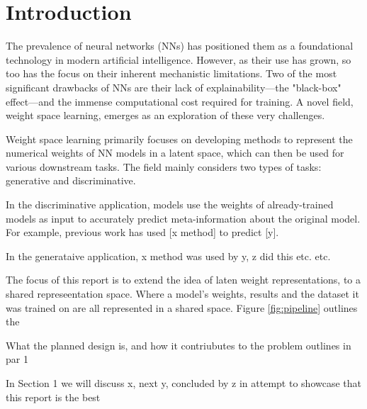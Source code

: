 \graphicspath{{introduction/fig/}}

\chapter{Introduction}
\label{chap:introduction}
The prevalence of neural networks (NNs) has positioned them as a foundational technology in modern artificial intelligence. However, as their use has grown, so too has the focus on their inherent mechanistic limitations. Two of the most significant drawbacks of NNs are their lack of explainability---the "black-box" effect---and the immense computational cost required for training. A novel field, weight space learning, emerges as an exploration of these very challenges.


Weight space learning primarily focuses on developing methods to represent the numerical weights of NN models in a latent space, which can then be used for various downstream tasks. The field mainly considers two types of tasks: generative and discriminative.

In the discriminative application, models use the weights of already-trained models as input to accurately predict meta-information about the original model. For example, previous work has used [x method] to predict [y].

In the generataive application, x method was used by y, z did this etc. etc. 


The focus of this report is to extend the idea of laten weight representations, to a shared represeentation space. Where a model's weights, results and the dataset it was trained on are all represented in a shared space. Figure \ref{fig:pipeline} outlines the 

What the planned design is, and how it contriubutes to the problem outlines in par 1

    In Section 1 we will discuss x, next y, concluded by z in attempt to showcase that this report is the best



